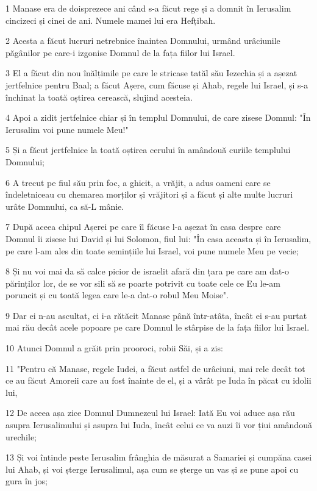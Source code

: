 \par 1 Manase era de doisprezece ani când s-a făcut rege și a domnit în Ierusalim cincizeci și cinei de ani. Numele mamei lui era Hefțibah.
\par 2 Acesta a făcut lucruri netrebnice înaintea Domnului, urmând urâciunile păgânilor pe care-i izgonise Domnul de la fața fiilor lui Israel.
\par 3 El a făcut din nou înălțimile pe care le stricase tatăl său Iezechia și a așezat jertfelnice pentru Baal; a făcut Așere, cum făcuse și Ahab, regele lui Israel, și s-a închinat la toată oștirea cerească, slujind acesteia.
\par 4 Apoi a zidit jertfelnice chiar și în templul Domnului, de care zisese Domnul: "În Ierusalim voi pune numele Meu!"
\par 5 Și a făcut jertfelnice la toată oștirea cerului în amândouă curiile templului Domnului;
\par 6 A trecut pe fiul său prin foc, a ghicit, a vrăjit, a adus oameni care se îndeletniceau cu chemarea morților și vrăjitori și a făcut și alte multe lucruri urâte Domnului, ca să-L mânie.
\par 7 După aceea chipul Așerei pe care îl făcuse l-a așezat în casa despre care Domnul îi zisese lui David și lui Solomon, fiul lui: "În casa aceasta și în Ierusalim, pe care l-am ales din toate semințiile lui Israel, voi pune numele Meu pe vecie;
\par 8 Și nu voi mai da să calce picior de israelit afară din țara pe care am dat-o părinților lor, de se vor sili să se poarte potrivit cu toate cele ce Eu le-am poruncit și cu toată legea care le-a dat-o robul Meu Moise".
\par 9 Dar ei n-au ascultat, ci i-a rătăcit Manase până într-atâta, încât ei s-au purtat mai rău decât acele popoare pe care Domnul le stârpise de la fața fiilor lui Israel.
\par 10 Atunci Domnul a grăit prin prooroci, robii Săi, și a zis:
\par 11 "Pentru că Manase, regele Iudei, a făcut astfel de urâciuni, mai rele decât tot ce au făcut Amoreii care au fost înainte de el, și a vârât pe Iuda în păcat cu idolii lui,
\par 12 De aceea așa zice Domnul Dumnezeul lui Israel: Iată Eu voi aduce așa rău asupra Ierusalimului și asupra lui Iuda, încât celui ce va auzi îi vor țiui amândouă urechile;
\par 13 Și voi întinde peste Ierusalim frânghia de măsurat a Samariei și cumpăna casei lui Ahab, și voi șterge Ierusalimul, așa cum se șterge un vas și se pune apoi cu gura în jos;
